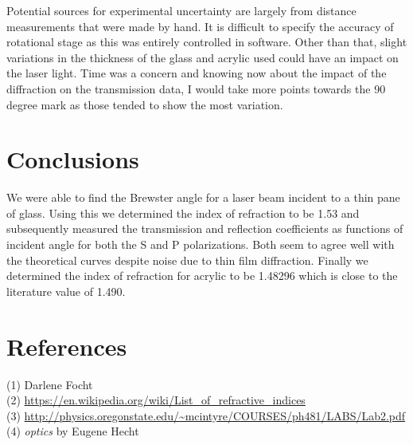 \documentclass[letter, 11pt, onecolumn]{article}
\begin{document}
\noindent 
Potential sources for experimental uncertainty are largely from distance measurements that were made by hand. It is difficult to specify the accuracy of rotational stage as this was entirely controlled in software. Other than that, slight variations in the thickness of the glass and acrylic used could have an impact on the laser light. Time was a concern and knowing now about the impact of the diffraction on the transmission data, I would take more points towards the 90 degree mark as those tended to show the most variation. 

\section*{Conclusions} 
We were able to find the Brewster angle for a laser beam incident to a thin pane of glass. Using this we determined the index of refraction to be 1.53 and subsequently measured the transmission and reflection coefficients as functions of incident angle for both the S and P polarizations. Both seem to agree well with the theoretical curves despite noise due to thin film diffraction. Finally we determined the index of refraction for acrylic to be 1.48296 which is close to the literature value of 1.490. 

\section*{References} 
(1) Darlene Focht \\
(2) \url{https://en.wikipedia.org/wiki/List_of_refractive_indices}\\
(3) \url{http://physics.oregonstate.edu/~mcintyre/COURSES/ph481/LABS/Lab2.pdf}\\
(4) \textit{optics} by Eugene Hecht \\
\end{document}

